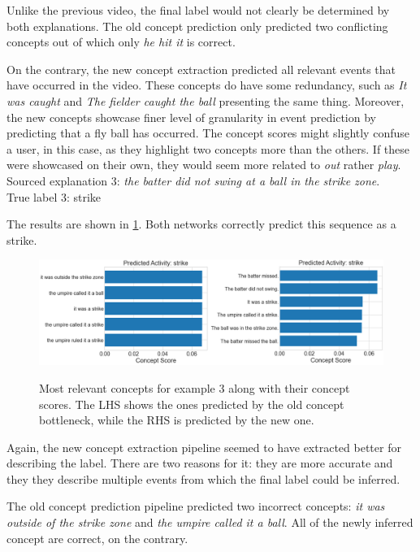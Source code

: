 Unlike the previous video, the final label would not clearly be determined by both explanations.
The old concept prediction only predicted two conflicting concepts out of which only \emph{he hit it} is correct.

On the contrary, the new concept extraction predicted all relevant events that have occurred in the video.
These concepts do have some redundancy, such as \emph{It was caught} and \emph{The fielder caught the ball} presenting the same thing.
Moreover, the new concepts showcase finer level of granularity in event prediction by predicting that a fly ball has occurred. 
The concept scores might slightly confuse a user, in this case, as they highlight two concepts more than the others. 
If these were showcased on their own, they would seem more related to \textit{out} rather \emph{play}. \\

Sourced explanation 3: \emph{the batter did not swing at a ball in the strike zone}. \\
True label 3: strike

The results are shown in \ref{concept-results-3}.
Both networks correctly predict this sequence as a strike.

\begin{figure}[h]
\caption{Most relevant concepts for example 3 along with their concept scores. The LHS shows the ones predicted by the old concept bottleneck, while the RHS is predicted by the new one.}
\centering
\includegraphics[width=\textwidth]{concept-bottleneck-pipeline/explanations_concepts3.png}
\label{concept-results-3}
\end{figure}

Again, the new concept extraction pipeline seemed to have extracted better for describing the label.
There are two reasons for it: they are more accurate and they they describe multiple events from which the final label could be inferred.

The old concept prediction pipeline predicted two incorrect concepts: \emph{it was outside of the strike zone} and \emph{the umpire called it a ball}.
All of the newly inferred concept are correct, on the contrary.

